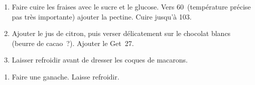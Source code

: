 \begin{recipe}
  \begin{enumerate}

  \item Faire cuire les fraises avec le sucre et le glucose.  Vers
    60\C\ (temp\'erature pr\'ecise pas tr\`es importante) ajouter la
    pectine.  Cuire jusqu'\`a 103\C.

  \item Ajouter le jus de citron, puis verser d\'elicatement sur le
    chocolat blancs (beurre de cacao~?).  Ajouter le Get~27.

  \item Laisser refroidir avant de dresser les coques de macarons.
  \end{enumerate}  
\end{recipe}



\begin{ingredients}
\end{ingredients}


\begin{recipe}
  \begin{enumerate}

  \item Faire une ganache.  Laisse  refroidir.

  \end{enumerate}
\end{recipe}
